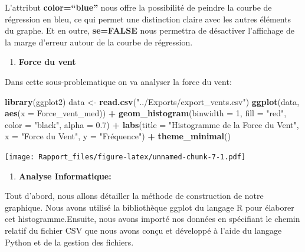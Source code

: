 \documentclass[
]{article}
\newenvironment{Shaded}{\begin{snugshade}}{\end{snugshade}}
\newcommand{\AttributeTok}[1]{\textcolor[rgb]{0.13,0.29,0.53}{#1}}
\newcommand{\DecValTok}[1]{\textcolor[rgb]{0.00,0.00,0.81}{#1}}
\newcommand{\FloatTok}[1]{\textcolor[rgb]{0.00,0.00,0.81}{#1}}
\newcommand{\FunctionTok}[1]{\textcolor[rgb]{0.13,0.29,0.53}{\textbf{#1}}}
\newcommand{\NormalTok}[1]{#1}
\newcommand{\OtherTok}[1]{\textcolor[rgb]{0.56,0.35,0.01}{#1}}
\newcommand{\SpecialCharTok}[1]{\textcolor[rgb]{0.81,0.36,0.00}{\textbf{#1}}}
\newcommand{\StringTok}[1]{\textcolor[rgb]{0.31,0.60,0.02}{#1}}
\providecommand{\tightlist}{%
  \setlength{\itemsep}{0pt}\setlength{\parskip}{0pt}}
\begin{document}
L'attribut \textbf{color=``blue''} nous offre la possibilité de peindre
la courbe de régression en bleu, ce qui permet une distinction claire
avec les autres éléments du graphe. Et en outre, \textbf{se=FALSE} nous
permettra de désactiver l'affichage de la marge d'erreur autour de la
courbe de régression.

\begin{enumerate}
\def\labelenumi{\arabic{enumi}.}
\tightlist
\item
  \textbf{Force du vent}
\end{enumerate}

Dans cette sous-problematique on va analyser la force du vent:

\begin{Shaded}
\begin{Highlighting}[]
\FunctionTok{library}\NormalTok{(ggplot2)}
\NormalTok{data }\OtherTok{\textless{}{-}} \FunctionTok{read.csv}\NormalTok{(}\StringTok{"../Exports/export\_vents.csv"}\NormalTok{)}
\FunctionTok{ggplot}\NormalTok{(data, }\FunctionTok{aes}\NormalTok{(}\AttributeTok{x =}\NormalTok{ Force\_vent\_med)) }\SpecialCharTok{+}
  \FunctionTok{geom\_histogram}\NormalTok{(}\AttributeTok{binwidth =} \DecValTok{1}\NormalTok{, }\AttributeTok{fill =} \StringTok{"red"}\NormalTok{, }\AttributeTok{color =} \StringTok{"black"}\NormalTok{, }\AttributeTok{alpha =} \FloatTok{0.7}\NormalTok{) }\SpecialCharTok{+}
  \FunctionTok{labs}\NormalTok{(}\AttributeTok{title =} \StringTok{"Histogramme de la Force du Vent"}\NormalTok{, }\AttributeTok{x =} \StringTok{"Force du Vent"}\NormalTok{, }\AttributeTok{y =} \StringTok{"Fréquence"}\NormalTok{) }\SpecialCharTok{+}
  \FunctionTok{theme\_minimal}\NormalTok{()}
\end{Highlighting}
\end{Shaded}

\texttt{[image: Rapport\_files/figure-latex/unnamed-chunk-7-1.pdf]}

\begin{enumerate}
\def\labelenumi{\arabic{enumi}.}
\tightlist
\item
  \textbf{Analyse Informatique:}
\end{enumerate}

Tout d'abord, nous allons détailler la méthode de construction de notre
graphique. Nous avons utilisé la bibliothèque ggplot du langage R pour
élaborer cet histogramme.Ensuite, nous avons importé nos données en
spécifiant le chemin relatif du fichier CSV que nous avons conçu et
développé à l'aide du langage Python et de la gestion des fichiers.
\end{document}
